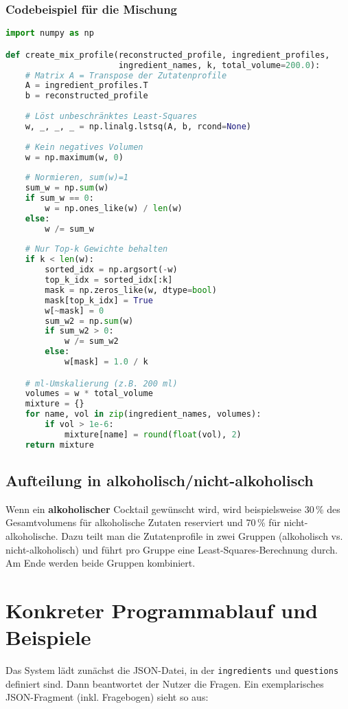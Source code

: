 \documentclass[12pt,a4paper]{report}
\begin{document}
\subsubsection*{Codebeispiel für die Mischung}
\begin{lstlisting}[language=Python, caption={Berechnung der Mischprofile mit Least Squares}]
import numpy as np

def create_mix_profile(reconstructed_profile, ingredient_profiles, 
                       ingredient_names, k, total_volume=200.0):
    # Matrix A = Transpose der Zutatenprofile
    A = ingredient_profiles.T  
    b = reconstructed_profile
    
    # Löst unbeschränktes Least-Squares
    w, _, _, _ = np.linalg.lstsq(A, b, rcond=None)
    
    # Kein negatives Volumen
    w = np.maximum(w, 0)
    
    # Normieren, sum(w)=1
    sum_w = np.sum(w)
    if sum_w == 0:
        w = np.ones_like(w) / len(w)
    else:
        w /= sum_w
    
    # Nur Top-k Gewichte behalten
    if k < len(w):
        sorted_idx = np.argsort(-w)
        top_k_idx = sorted_idx[:k]
        mask = np.zeros_like(w, dtype=bool)
        mask[top_k_idx] = True
        w[~mask] = 0
        sum_w2 = np.sum(w)
        if sum_w2 > 0:
            w /= sum_w2
        else:
            w[mask] = 1.0 / k

    # ml-Umskalierung (z.B. 200 ml)
    volumes = w * total_volume
    mixture = {}
    for name, vol in zip(ingredient_names, volumes):
        if vol > 1e-6:
            mixture[name] = round(float(vol), 2)
    return mixture
\end{lstlisting}

\subsection{Aufteilung in alkoholisch/nicht-alkoholisch}
Wenn ein \textbf{alkoholischer} Cocktail gewünscht wird, wird beispielsweise 30\,\% des Gesamtvolumens für alkoholische Zutaten reserviert und 70\,\% für nicht-alkoholische. Dazu teilt man die Zutatenprofile in zwei Gruppen (alkoholisch vs. nicht-alkoholisch) und führt pro Gruppe eine Least-Squares-Berechnung durch. Am Ende werden beide Gruppen kombiniert.

\section{Konkreter Programmablauf und Beispiele}
Das System lädt zunächst die JSON-Datei, in der \texttt{ingredients} und \texttt{questions} definiert sind. Dann beantwortet der Nutzer die Fragen. Ein exemplarisches JSON-Fragment (inkl. Fragebogen) sieht so aus:
\end{document}
